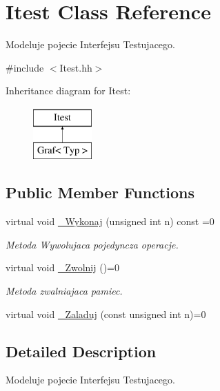 \hypertarget{class_itest}{\section{Itest Class Reference}
\label{class_itest}
}


Modeluje pojecie Interfejsu Testujacego.  




{\ttfamily \#include $<$Itest.\-hh$>$}

Inheritance diagram for Itest\-:\begin{figure}[H]
\begin{center}
\leavevmode
\includegraphics[height=2.000000cm]{class_itest}
\end{center}
\end{figure}
\subsection*{Public Member Functions}
\begin{DoxyCompactItemize}
\item 
virtual void \hyperlink{class_itest_a39d04d2e34c9d7e9606e3f987b683d5c}{\-\_\-\-Wykonaj} (unsigned int n) const =0
\begin{DoxyCompactList}\small\item\em Metoda Wywolujaca pojedyncza operacje. \end{DoxyCompactList}\item 
virtual void \hyperlink{class_itest_a62ba16b48b1a40321cf8445db6a7b4f4}{\-\_\-\-Zwolnij} ()=0
\begin{DoxyCompactList}\small\item\em Metoda zwalniajaca pamiec. \end{DoxyCompactList}\item 
virtual void \hyperlink{class_itest_a7565db7c0a4d736f218db9d0f5ceff7a}{\-\_\-\-Zaladuj} (const unsigned int n)=0
\end{DoxyCompactItemize}


\subsection{Detailed Description}
Modeluje pojecie Interfejsu Testujacego. 

